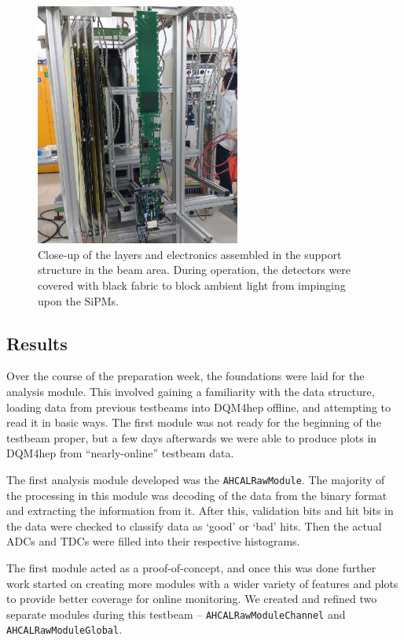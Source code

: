 \begin{figure}[p]
	\centering
	\includegraphics[width=0.6\textwidth]{../Pictures/AHCAL-DESY-2016-Assembled-2.jpg}
	\caption{Close-up of the layers and electronics assembled in the support structure in the beam area. During operation, the detectors were covered with black fabric to block ambient light from impinging upon the \acrshort{SiPM}s.}
	\label{figure:aida/may2016/assembled}
\end{figure}

\subsection{Results}
Over the course of the preparation week, the foundations were laid for the analysis module. This involved gaining a familiarity with the data structure, loading data from previous testbeams into \acrshort{DQM4hep} offline, and attempting to read it in basic ways. The first module was not ready for the beginning of the testbeam proper, but a few days afterwards we were able to produce plots in \acrshort{DQM4hep} from ``nearly-online'' testbeam data.

The first analysis module developed was the \texttt{AHCALRawModule}. The majority of the processing in this module was decoding of the data from the binary format and extracting the information from it. After this, validation bits and hit bits in the data were checked to classify data as `good' or `bad' hits. Then the actual \acrshort{ADC}s and \acrshort{TDC}s were filled into their respective histograms. 

The first module acted as a proof-of-concept, and once this was done further work started on creating more modules with a wider variety of features and plots to provide better coverage for online monitoring. We created and refined two separate modules during this testbeam -- \texttt{AHCALRawModuleChannel} and \texttt{AHCALRawModuleGlobal}. 


